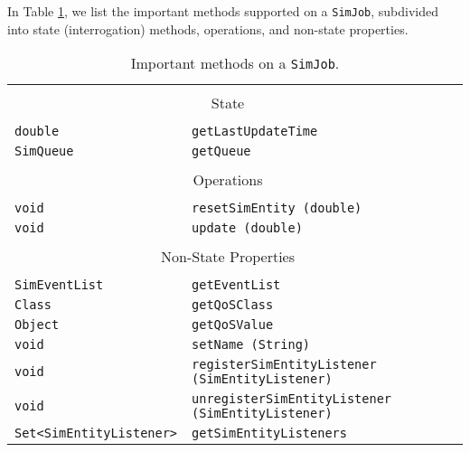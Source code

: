 In Table \ref{tab:guided:simjob-methods},
we list the important methods supported on a \lstinline|SimJob|,
subdivided into state (interrogation) methods,
operations,
and non-state properties.

\begin{table}
\label{tab:guided:simjob-methods}
\caption{Important methods on a \texttt{SimJob}.}
\begin{center}
\begin{tabular}{|l|l|l|}
\hline
\multicolumn{2}{|c|}{}      \\
\multicolumn{2}{|c|}{\large State} \\
\multicolumn{2}{|c|}{}      \\
\hline
\lstinline|double|      & \lstinline|getLastUpdateTime|            \\ \hline
\lstinline|SimQueue|    & \lstinline|getQueue|                     \\ \hline
\hline
\multicolumn{2}{|c|}{}                  \\
\multicolumn{2}{|c|}{\large Operations} \\
\multicolumn{2}{|c|}{}                  \\
\hline
\lstinline|void|    & \lstinline|resetSimEntity (double)|                        \\ \hline
\lstinline|void|    & \lstinline|update (double)|                                \\ \hline
\hline
\multicolumn{2}{|c|}{} \\
\multicolumn{2}{|c|}{\large Non-State Properties} \\
\multicolumn{2}{|c|}{}                  \\
\hline
\lstinline|SimEventList| & \lstinline|getEventList|     \\
\hline
\lstinline|Class|  & \lstinline|getQoSClass|            \\
\lstinline|Object| & \lstinline|getQoSValue|            \\
\hline
\lstinline|void|   & \lstinline|setName (String)|       \\
\hline
\lstinline|void|                   & \lstinline|registerSimEntityListener (SimEntityListener)|   \\
\lstinline|void|                   & \lstinline|unregisterSimEntityListener (SimEntityListener)| \\
\lstinline|Set<SimEntityListener>| & \lstinline|getSimEntityListeners|                           \\
\hline
\end{tabular}
\end{center}
\end{table}